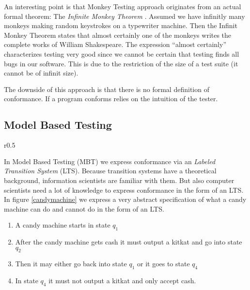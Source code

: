 \documentclass[a4paper, 12pt]{article} %
\begin{document}
An interesting point is that Monkey Testing approach originates from an
actual formal theorem: The \textit{Infinite Monkey Theorem} \cite{monkey}.
Assumed we have infinitly many monkeys making random keystrokes on a typewriter
machine. Then the Infinit Monkey Theorem states that almost
certainly one of the monkeys writes the complete works of William Shakespeare.
The expression ``almost certainly'' characterizes testing very good since we
cannot be certain that testing finds all bugs in our software. This is due to
the restriction of the size of a test suite (it cannot be of infinit size). 

The downside of this approach is that there is no formal definition of
conformance. If a program conforms relies on the intuition of the tester. 

\subsection*{Model Based Testing}

\begin{wrapfigure}{r}{0.5\textwidth} %
\caption{Candy machine specification}
\label{candymachine}
\begin{center}
\end{center}
\end{wrapfigure}
In Model Based Testing (MBT) we express conformance via an \textit{Labeled
Transition System} (LTS). Because transition systems have a theoretical
background, information scientists are familiar with them. But also computer
scientists need a lot of knowledge to express conformance in the form of an LTS. 
In figure \ref{candymachine} we express a very abstract specification of what a candy
machine can do and cannot do in the form of an LTS.
\begin{enumerate}
  \item A candy machine starts in state $q_1$
  \item After the candy machine gets cash it must output a
  kitkat and go into state $q_2$
  \item Then it may either go back into state $q_1$ or it goes to state $q_4$
  \item In state $q_4$ it must not output a kitkat and only accept cash.
\end{enumerate}
\end{document}
